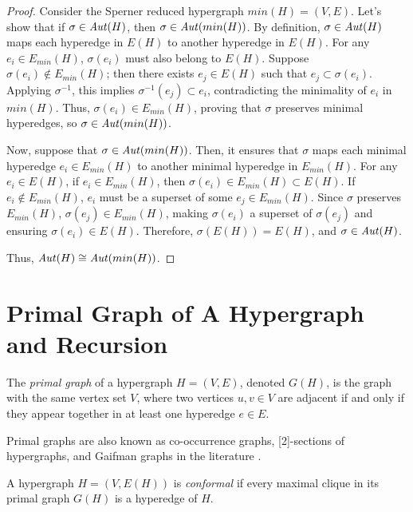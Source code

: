 \begin{proof}
Consider the Sperner reduced hypergraph $min(H)=(V,E)$. Let's show that if $\sigma\in\mathit{Aut}(H)$, then $\sigma\in\mathit{Aut}(min(H))$. By definition, $\sigma\in\mathit{Aut}(H)$ maps each hyperedge in $E(H)$ to another hyperedge in $E(H)$. For any $e_i\in E_{min}(H)$, $\sigma(e_i)$ must also belong to $E(H)$. Suppose $\sigma(e_i)\notin E_{min}(H)$; then there exists $e_j\in E(H)$ such that $e_j\subset\sigma(e_i)$. Applying $\sigma^{-1}$, this implies $\sigma^{-1}(e_j)\subset e_i$, contradicting the minimality of $e_i$ in $min(H)$. Thus, $\sigma(e_i)\in E_{min}(H)$, proving that $\sigma$ preserves minimal hyperedges, so $\sigma\in\mathit{Aut}(min(H))$.

Now, suppose that $\sigma\in\mathit{Aut}(min(H))$. Then, it ensures that $\sigma$ maps each minimal hyperedge $e_i\in E_{min}(H)$ to another minimal hyperedge in $E_{min}(H)$. For any $e_i\in E(H)$, if $e_i\in E_{min}(H)$, then $\sigma(e_i)\in E_{min}(H)\subset E(H)$. If $e_i\notin E_{min}(H)$, $e_i$ must be a superset of some $e_j\in E_{min}(H)$. Since $\sigma$ preserves $E_{min}(H)$, $\sigma(e_j)\in E_{min}(H)$, making $\sigma(e_i)$ a superset of $\sigma(e_j)$ and ensuring $\sigma(e_i)\in E(H)$. Therefore, $\sigma(E(H))=E(H)$, and $\sigma\in\mathit{Aut}(H)$.

Thus, $\mathit{Aut}(H)\cong\mathit{Aut}(min(H))$.
\end{proof}

\section{Primal Graph of A Hypergraph and \FKA{} Recursion}

\begin{definition}
The \emph{primal graph} of a hypergraph $H=(V,E)$, denoted $G(H)$, is the graph with the same vertex set $V$, where two vertices $u,v\in V$ are adjacent if and only if they appear together in at least one hyperedge $e\in E$.
\end{definition}

Primal graphs are also known as co-occurrence graphs, [2]-sections of hypergraphs, and Gaifman graphs in the literature \cite{DPP18}.

\begin{definition}
A hypergraph $H=(V,E(H))$ is \emph{conformal} if every maximal clique in its primal graph $G(H)$ is a hyperedge of $H$.
\end{definition}

